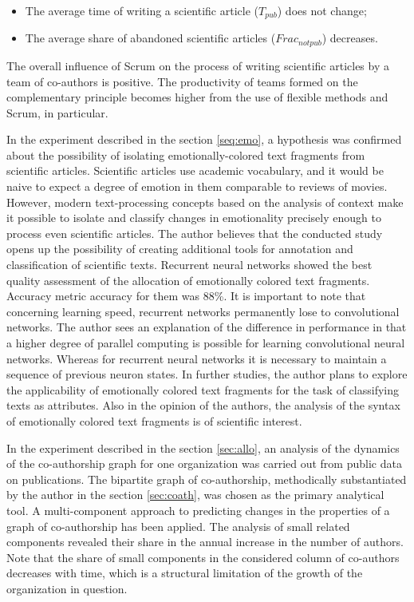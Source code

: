 \documentclass[12pt]{report}
\theoremstyle{definition}
\providecommand{\tightlist}{%
	\setlength{\itemsep}{0pt}\setlength{\parskip}{0pt}}
\begin{document}
\begin{itemize}
	\tightlist
	\item  The average time of writing a scientific article ($T_{pub}$) does not change;
	\item  The average share of abandoned scientific articles ($Frac_{notpub}$) decreases.
\end{itemize}

The overall influence of Scrum on the process of writing scientific articles by a team of co-authors is positive.
The productivity of teams formed on the complementary principle becomes higher from the use of flexible methods and Scrum, in particular.

In the experiment described in the section \ref{seq:emo}, a hypothesis was confirmed about the possibility of isolating emotionally-colored text fragments from scientific articles.
Scientific articles use academic vocabulary, and it would be naive to expect a degree of emotion in them comparable to reviews of movies. However, modern text-processing concepts based on the analysis of context make it possible to isolate and classify changes in emotionality precisely enough to process even scientific articles. The author believes that the conducted study opens up the possibility of creating additional tools for annotation and classification of scientific texts.
Recurrent neural networks showed the best quality assessment of the allocation of emotionally colored text fragments. Accuracy metric accuracy for them was 88\%. It is important to note that concerning learning speed, recurrent networks permanently lose to convolutional networks. The author sees an explanation of the difference in performance in that a higher degree of parallel computing is possible for learning convolutional neural networks. Whereas for recurrent neural networks it is necessary to maintain a sequence of previous neuron states.
In further studies, the author plans to explore the applicability of emotionally colored text fragments for the task of classifying texts as attributes. Also in the opinion of the authors, the analysis of the syntax of emotionally colored text fragments is of scientific interest.


In the experiment described in the section \ref{sec:allo}, an analysis of the dynamics of the co-authorship graph for one organization was carried out from public data on publications. 
The bipartite graph of co-authorship, methodically substantiated by the author in the section \ref{sec:coath}, was chosen as the primary analytical tool.
A multi-component approach to predicting changes in the properties of a graph of co-authorship has been applied. 
The analysis of small related components revealed their share in the annual increase in the number of authors. 
Note that the share of small components in the considered column of co-authors decreases with time, which is a structural limitation of the growth of the organization in question.
\end{document}
